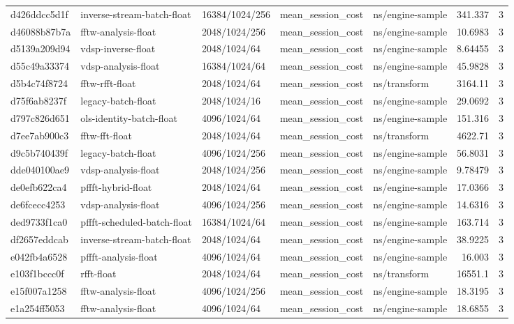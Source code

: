 \begin{longtable}{lllllrr}
d426ddcc5d1f & inverse-stream-batch-float & 16384/1024/256 & mean\_session\_cost & ns/engine-sample & 341.337 & 3 \\
d46088b87b7a & fftw-analysis-float & 2048/1024/256 & mean\_session\_cost & ns/engine-sample & 10.6983 & 3 \\
d5139a209d94 & vdsp-inverse-float & 2048/1024/64 & mean\_session\_cost & ns/engine-sample & 8.64455 & 3 \\
d55c49a33374 & vdsp-analysis-float & 16384/1024/64 & mean\_session\_cost & ns/engine-sample & 45.9828 & 3 \\
d5b4c74f8724 & fftw-rfft-float & 2048/1024/64 & mean\_session\_cost & ns/transform & 3164.11 & 3 \\
d75f6ab8237f & legacy-batch-float & 2048/1024/16 & mean\_session\_cost & ns/engine-sample & 29.0692 & 3 \\
d797c826d651 & ols-identity-batch-float & 4096/1024/64 & mean\_session\_cost & ns/engine-sample & 151.316 & 3 \\
d7ee7ab900c3 & fftw-fft-float & 2048/1024/64 & mean\_session\_cost & ns/transform & 4622.71 & 3 \\
d9c5b740439f & legacy-batch-float & 4096/1024/256 & mean\_session\_cost & ns/engine-sample & 56.8031 & 3 \\
dde040100ae9 & vdsp-analysis-float & 2048/1024/256 & mean\_session\_cost & ns/engine-sample & 9.78479 & 3 \\
de0efb622ca4 & pffft-hybrid-float & 2048/1024/64 & mean\_session\_cost & ns/engine-sample & 17.0366 & 3 \\
de6fcecc4253 & vdsp-analysis-float & 4096/1024/256 & mean\_session\_cost & ns/engine-sample & 14.6316 & 3 \\
ded9733f1ca0 & pffft-scheduled-batch-float & 16384/1024/64 & mean\_session\_cost & ns/engine-sample & 163.714 & 3 \\
df2657eddcab & inverse-stream-batch-float & 2048/1024/64 & mean\_session\_cost & ns/engine-sample & 38.9225 & 3 \\
e042fb4a6528 & pffft-analysis-float & 4096/1024/64 & mean\_session\_cost & ns/engine-sample & 16.003 & 3 \\
e103f1bccc0f & rfft-float & 2048/1024/64 & mean\_session\_cost & ns/transform & 16551.1 & 3 \\
e15f007a1258 & fftw-analysis-float & 4096/1024/256 & mean\_session\_cost & ns/engine-sample & 18.3195 & 3 \\
e1a254ff5053 & fftw-analysis-float & 4096/1024/64 & mean\_session\_cost & ns/engine-sample & 18.6855 & 3 \\

\end{longtable}
